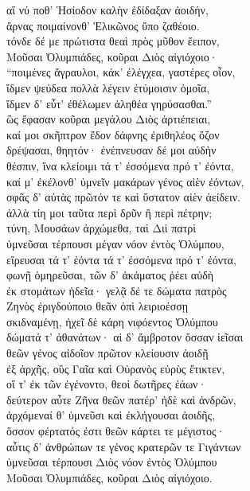 \begin{pages}
\begin{Leftside}
\quad{}αἵ νύ ποθ' Ἡσίοδον καλὴν ἐδίδαξαν ἀοιδήν,\\
ἄρνας ποιμαίνονθ' Ἑλικῶνος ὕπο ζαθέοιο.\\
τόνδε δέ με πρώτιστα θεαὶ πρὸς μῦθον ἔειπον,\\
Μοῦσαι Ὀλυμπιάδες, κοῦραι Διὸς αἰγιόχοιο·  \\
``ποιμένες ἄγραυλοι, κάκ' ἐλέγχεα, γαστέρες οἶον,\\
ἴδμεν ψεύδεα πολλὰ λέγειν ἐτύμοισιν ὁμοῖα,\\
ἴδμεν δ' εὖτ' ἐθέλωμεν ἀληθέα γηρύσασθαι.''\\
ὣς ἔφασαν κοῦραι μεγάλου Διὸς ἀρτιέπειαι,\\
καί μοι σκῆπτρον ἔδον δάφνης ἐριθηλέος ὄζον \\
δρέψασαι, θηητόν· ἐνέπνευσαν δέ μοι αὐδὴν \\
θέσπιν, ἵνα κλείοιμι τά τ' ἐσσόμενα πρό τ' ἐόντα, \\
καί μ' ἐκέλονθ' ὑμνεῖν μακάρων γένος αἰὲν ἐόντων,\\
σφᾶς δ' αὐτὰς πρῶτόν τε καὶ ὕστατον αἰὲν ἀείδειν.\\

\quad{}ἀλλὰ τίη μοι ταῦτα περὶ δρῦν ἢ περὶ πέτρην;  \\
τύνη, Μουσάων ἀρχώμεθα, ταὶ Διὶ πατρὶ\\
ὑμνεῦσαι τέρπουσι μέγαν νόον ἐντὸς Ὀλύμπου,\\
εἴρευσαι τά τ' ἐόντα τά τ' ἐσσόμενα πρό τ' ἐόντα,\\
φωνῇ ὁμηρεῦσαι, τῶν δ' ἀκάματος ῥέει αὐδὴ \\
ἐκ στομάτων ἡδεῖα· γελᾷ δέ τε δώματα πατρὸς  \\
Ζηνὸς ἐριγδούποιο θεᾶν ὀπὶ λειριοέσσῃ\\
σκιδναμένῃ, ἠχεῖ δὲ κάρη νιφόεντος Ὀλύμπου \\
δώματά τ' ἀθανάτων· αἱ δ' ἄμβροτον ὄσσαν ἱεῖσαι \\
θεῶν γένος αἰδοῖον πρῶτον κλείουσιν ἀοιδῇ\\
ἐξ ἀρχῆς, οὓς Γαῖα καὶ Οὐρανὸς εὐρὺς ἔτικτεν, \\
οἵ τ' ἐκ τῶν ἐγένοντο, θεοὶ δωτῆρες ἐάων· \\
δεύτερον αὖτε Ζῆνα θεῶν πατέρ' ἠδὲ καὶ ἀνδρῶν, \\
ἀρχόμεναί θ' ὑμνεῦσι καὶ ἐκλήγουσαι ἀοιδῆς,\\
ὅσσον φέρτατός ἐστι θεῶν κάρτει τε μέγιστος·\\
αὖτις δ' ἀνθρώπων τε γένος κρατερῶν τε Γιγάντων \\
ὑμνεῦσαι τέρπουσι Διὸς νόον ἐντὸς Ὀλύμπου\\
Μοῦσαι Ὀλυμπιάδες, κοῦραι Διὸς αἰγιόχοιο.\\


\end{Leftside}
\end{pages}
